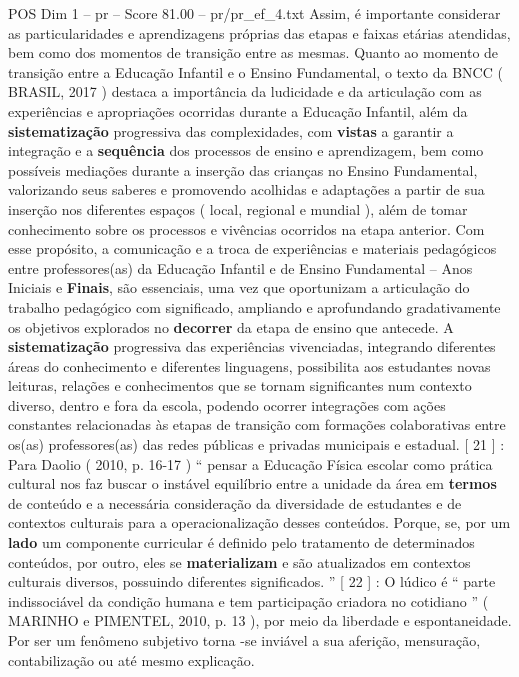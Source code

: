 \begin{textsample}{POS Dim 1 – pr – Score 81.00 – pr/pr\_ef\_4.txt}
Assim, é importante considerar as particularidades e aprendizagens próprias das etapas e faixas etárias atendidas, bem como dos momentos de transição entre as mesmas.
Quanto ao momento de transição entre a Educação Infantil e o Ensino Fundamental, o texto da BNCC ( BRASIL, 2017 ) destaca a importância da ludicidade e da articulação com as experiências e apropriações ocorridas durante a Educação Infantil, além da \textbf{sistematização} progressiva das complexidades, com \textbf{vistas} a garantir a integração e a \textbf{sequência} dos processos de ensino e aprendizagem, bem como possíveis mediações durante a inserção das crianças no Ensino Fundamental, valorizando seus saberes e promovendo acolhidas e adaptações a partir de sua inserção nos diferentes espaços ( local, regional e mundial ), além de tomar conhecimento sobre os processos e vivências ocorridos na etapa anterior.
Com esse propósito, a comunicação e a troca de experiências e materiais pedagógicos entre professores(as) da Educação Infantil e de Ensino Fundamental – Anos Iniciais e \textbf{Finais}, são essenciais, uma vez que oportunizam a articulação do trabalho pedagógico com significado, ampliando e aprofundando gradativamente os objetivos explorados no \textbf{decorrer} da etapa de ensino que antecede.
A \textbf{sistematização} progressiva das experiências vivenciadas, integrando diferentes áreas do conhecimento e diferentes linguagens, possibilita aos estudantes novas leituras, relações e conhecimentos que se tornam significantes num contexto diverso, dentro e fora da escola, podendo ocorrer integrações com ações constantes relacionadas às etapas de transição com formações colaborativas entre os(as) professores(as) das redes públicas e privadas municipais e estadual. [ 21 ] : Para Daolio ( 2010, p. 16-17 ) “ pensar a Educação Física escolar como prática cultural nos faz buscar o instável equilíbrio entre a unidade da área em \textbf{termos} de conteúdo e a necessária consideração da diversidade de estudantes e de contextos culturais para a operacionalização desses conteúdos.
Porque, se, por um \textbf{lado} um componente curricular é definido pelo tratamento de determinados conteúdos, por outro, eles se \textbf{materializam} e são atualizados em contextos culturais diversos, possuindo diferentes significados. ” [ 22 ] : O lúdico é “ parte indissociável da condição humana e tem participação criadora no cotidiano ” ( MARINHO e PIMENTEL, 2010, p. 13 ), por meio da liberdade e espontaneidade.
Por ser um fenômeno subjetivo torna -se inviável a sua aferição, mensuração, contabilização ou até mesmo explicação.

\end{textsample}
